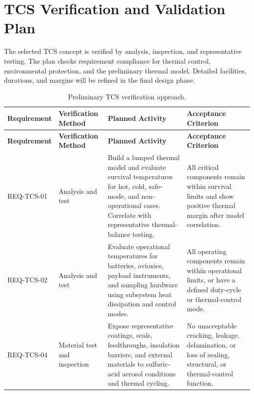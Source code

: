 \normalsize



\section{TCS Verification and Validation Plan}
\label{sec:tcs_vv}

The selected TCS concept is verified by analysis, inspection, and representative testing. The plan checks requirement compliance for thermal control, environmental protection, and the preliminary thermal model. Detailed facilities, durations, and margins will be refined in the final design phase.

\small
\renewcommand{\arraystretch}{1.12}
\setlength{\tabcolsep}{3pt}

\begin{longtable}{|p{2.4cm}|p{2.8cm}|p{5.0cm}|p{5.0cm}|}
\caption{Preliminary TCS verification approach.}
\label{tab:tcs_verification}\\
\hline
\textbf{Requirement} &
\textbf{Verification Method} &
\textbf{Planned Activity} &
\textbf{Acceptance Criterion} \\
\hline
\endfirsthead

\hline
\textbf{Requirement} &
\textbf{Verification Method} &
\textbf{Planned Activity} &
\textbf{Acceptance Criterion} \\
\hline
\endhead

REQ-TCS-01 &
Analysis and test &
Build a lumped thermal model and evaluate survival temperatures for hot, cold, safe-mode, and non-operational cases. Correlate with representative thermal-balance testing. &
All critical components remain within survival limits and show positive thermal margin after model correlation. \\
\hline

REQ-TCS-02 &
Analysis and test &
Evaluate operational temperatures for batteries, avionics, payload instruments, and sampling hardware using subsystem heat dissipation and control modes. &
All operating components remain within operational limits, or have a defined duty-cycle or thermal-control mode. \\
\hline

REQ-TCS-04 &
Material test and inspection &
Expose representative coatings, seals, feedthroughs, insulation barriers, and external materials to sulfuric-acid aerosol conditions and thermal cycling. &
No unacceptable cracking, leakage, delamination, or loss of sealing, structural, or thermal-control function. \\
\hline


\end{longtable}
